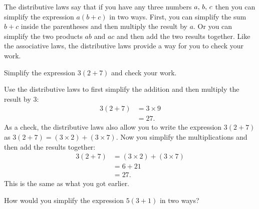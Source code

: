 \documentclass[a4paper,oneside,12pt]{article}
\begin{document}
The distributive laws say that if you have any three numbers
${a},\, {b},\, {c}$ then you can simplify the expression
$a(b + c)$ in two ways.  First, you can simplify the sum $b + c$
inside the parentheses and then multiply the result by $a$.  Or you
can simplify the two products $ab$ and $ac$ and then add the two
results together.  Like the associative laws, the distributive laws
provide a way for you to check your work.

\begin{example}
Simplify the expression $3 (2 + 7)$ and check your work.
\end{example}

\begin{solution}
Use the distributive laws to first simplify the addition and then
multiply the result by $3$:
\begin{align*}
3 (2 + 7)
&=
3 \times 9 \\[4pt]
&=
27.
\end{align*}
As a check, the distributive laws also allow you to write the
expression $3 (2 + 7)$ as $3 (2 + 7) = (3 \times 2) + (3 \times 7)$.
Now you simplify the multiplications and then add the results
together:
\begin{align*}
3 (2 + 7)
&=
(3 \times 2) + (3 \times 7) \\[4pt]
&=
6 + 21 \\[4pt]
&=
27.
\end{align*}
This is the same as what you got earlier.
\end{solution}

\begin{exercise}
How would you simplify the expression $5 (3 + 1)$ in two ways?
\end{exercise}

\end{document}
